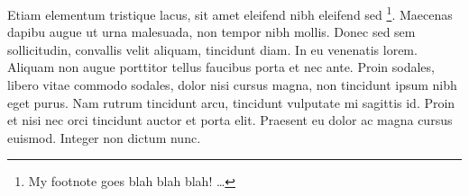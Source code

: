 Etiam elementum tristique lacus, sit amet eleifend nibh eleifend sed
\footnote{My footnote goes blah blah blah! \dots}. Maecenas dapibu augue ut urna
malesuada, non tempor nibh mollis. Donec sed sem sollicitudin, convallis velit
aliquam, tincidunt diam. In eu venenatis lorem. Aliquam non augue porttitor
tellus faucibus porta et nec ante. Proin sodales, libero vitae commodo sodales,
dolor nisi cursus magna, non tincidunt ipsum nibh eget purus. Nam rutrum tincidunt
arcu, tincidunt vulputate mi sagittis id. Proin et nisi nec orci tincidunt
auctor et porta elit. Praesent eu dolor ac magna cursus euismod. Integer non
dictum nunc.
